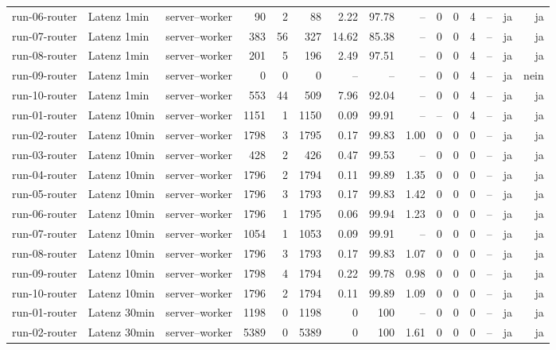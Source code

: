 \begin{table}
{\begin{tabular}{l l p{3.2cm} r r r r r r r r r r r r}
run-06-router & Latenz 1min & server--worker & 90 & 2 & 88 & 2.22 & 97.78 & -- & 0 & 0 & 4 & -- & ja & ja \\
run-07-router & Latenz 1min & server--worker & 383 & 56 & 327 & 14.62 & 85.38 & -- & 0 & 0 & 4 & -- & ja & ja \\
run-08-router & Latenz 1min & server--worker & 201 & 5 & 196 & 2.49 & 97.51 & -- & 0 & 0 & 4 & -- & ja & ja \\
run-09-router & Latenz 1min & server--worker & 0 & 0 & 0 & -- & -- & -- & 0 & 0 & 4 & -- & ja & nein \\
run-10-router & Latenz 1min & server--worker & 553 & 44 & 509 & 7.96 & 92.04 & -- & 0 & 0 & 4 & -- & ja & ja \\
run-01-router & Latenz 10min & server--worker & 1151 & 1 & 1150 & 0.09 & 99.91 & -- & -- & 0 & 4 & -- & ja & ja \\
run-02-router & Latenz 10min & server--worker & 1798 & 3 & 1795 & 0.17 & 99.83 & 1.00 & 0 & 0 & 0 & -- & ja & ja \\
run-03-router & Latenz 10min & server--worker & 428 & 2 & 426 & 0.47 & 99.53 & -- & 0 & 0 & 0 & -- & ja & ja \\
run-04-router & Latenz 10min & server--worker & 1796 & 2 & 1794 & 0.11 & 99.89 & 1.35 & 0 & 0 & 0 & -- & ja & ja \\
run-05-router & Latenz 10min & server--worker & 1796 & 3 & 1793 & 0.17 & 99.83 & 1.42 & 0 & 0 & 0 & -- & ja & ja \\
run-06-router & Latenz 10min & server--worker & 1796 & 1 & 1795 & 0.06 & 99.94 & 1.23 & 0 & 0 & 0 & -- & ja & ja \\
run-07-router & Latenz 10min & server--worker & 1054 & 1 & 1053 & 0.09 & 99.91 & -- & 0 & 0 & 0 & -- & ja & ja \\
run-08-router & Latenz 10min & server--worker & 1796 & 3 & 1793 & 0.17 & 99.83 & 1.07 & 0 & 0 & 0 & -- & ja & ja \\
run-09-router & Latenz 10min & server--worker & 1798 & 4 & 1794 & 0.22 & 99.78 & 0.98 & 0 & 0 & 0 & -- & ja & ja \\
run-10-router & Latenz 10min & server--worker & 1796 & 2 & 1794 & 0.11 & 99.89 & 1.09 & 0 & 0 & 0 & -- & ja & ja \\
run-01-router & Latenz 30min & server--worker & 1198 & 0 & 1198 & 0 & 100 & -- & 0 & 0 & 0 & -- & ja & ja \\
run-02-router & Latenz 30min & server--worker & 5389 & 0 & 5389 & 0 & 100 & 1.61 & 0 & 0 & 0 & -- & ja & ja \\

\end{tabular}}
\end{table}
